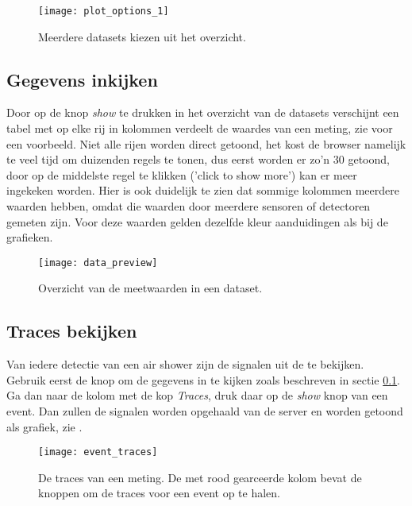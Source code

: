 \begin{figure}
    \centering
    \texttt{[image: plot\_options\_1]}
    \caption{Meerdere datasets kiezen uit het overzicht.}
    \label{fig:plot_options_1}
\end{figure}


\subsection{Gegevens inkijken}\label{subsec:gegevens}

Door op de knop \emph{show} te drukken in het overzicht van de datasets
verschijnt een tabel met op elke rij in kolommen verdeelt de waardes van
een meting, zie  voor een voorbeeld. Niet alle
rijen worden direct getoond, het kost de browser namelijk te veel tijd
om duizenden regels te tonen, dus eerst worden er zo'n 30 getoond, door
op de middelste regel te klikken ('click to show more') kan er meer
ingekeken worden. Hier is ook duidelijk te zien dat sommige kolommen
meerdere waarden hebben, omdat die waarden door meerdere sensoren of detectoren
gemeten zijn. Voor deze waarden gelden dezelfde kleur aanduidingen als bij 
de grafieken.

\begin{figure}
    \centering
    \texttt{[image: data\_preview]}
    \caption{Overzicht van de meetwaarden in een dataset.}
    \label{fig:data_preview}
\end{figure}


\subsection{Traces bekijken}

Van iedere detectie van een air shower zijn de signalen uit de \pmts te
bekijken. Gebruik eerst de knop om de gegevens in te kijken zoals
beschreven in sectie \ref{subsec:gegevens}. Ga dan naar de kolom met de
kop \emph{Traces}, druk daar op de \emph{show} knop van een event. Dan
zullen de \pmt signalen worden opgehaald van de server en worden getoond
als grafiek, zie .

\begin{figure}
    \centering
    \texttt{[image: event\_traces]}
    \caption{De traces van een meting. De met rood gearceerde kolom
             bevat de knoppen om de traces voor een event op te halen.}
    \label{fig:event_traces}
\end{figure}


